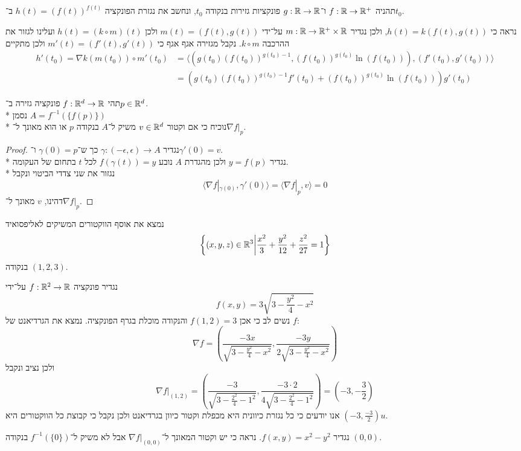 \Subquestion{}
תהניה $f : \mathbb{R} \to \mathbb{R}^+$ ו־$g : \mathbb{R} \to \mathbb{R}$ פונקציות גזירות בנקודה $t_0$, ונחשב את נגזרת הפונקציה $h(t) = {(f(t))}^{f(t)}$ ב־$t_0$.

נראה כי $h(t) = k(f(t), g(t))$, ולכן נגדיר $m : \mathbb{R} \to \mathbb{R}^+ \times \mathbb{R}$ על־ידי $m(t) = (f(t), g(t))$ ולכן $h(t) = (k \circ m)(t)$ ועלינו לגזור את ההרכבה $k \circ m$.
נקבל מגזירה אגף אגף כי $m'(t) = (f'(t), g'(t))$ ולכן מתקיים
\begin{align*}
	h'(t_0) = \nabla k(m(t_0)) \circ m'(t_0)
	& = \langle (g(t_0) {(f(t_0))}^{g(t_0) - 1}, {(f(t_0))}^{g(t_0)} \ln(f(t_0))), (f'(t_0), g'(t_0)) \rangle \\
	& =  (g(t_0) {(f(t_0))}^{g(t_0) - 1} f'(t_0) + {(f(t_0))}^{g(t_0)} \ln(f(t_0))) g'(t_0)
\end{align*}

\Question{}
\Subquestion{}
תהי $f : \mathbb{R}^d \to \mathbb{R}$ פונקציה גזירה ב־$p \in \mathbb{R}^d$. \\*
נסמן $A = f^{-1}(\{f(p)\})$ \\*
נוכיח כי אם וקטור $v \in \mathbb{R}^d$ משיק ל־$A$ בנקודה $p$ או הוא מאונך ל־$\nabla f |_p$.
\begin{proof}
	נגדיר $\gamma : (-\epsilon, \epsilon) \to A$ כך ש־$\gamma(0) = p$ ו־$\gamma'(0) = v$. \\*
	נגדיר $y = f(p)$ ולכן מהגדרת $A$ נובע $f(\gamma(t)) = y$ לכל $t$ בתחום של העקומה. \\*
	נגזור את שני צדדי הביטוי ונקבל
	\[
		\langle \nabla f |_{\gamma(0)}, \gamma'(0) \rangle = \langle \nabla f |_p, v \rangle = 0
	\]
	דהינו, $v$ מאונך ל־$\nabla f |_p$.
\end{proof}

\Subquestion{}
נמצא את אוסף הווקטורים המשיקים לאליפסואיד
\[
	\left\{ (x, y, z) \in \mathbb{R}^3 \middle| \frac{x^2}{3} + \frac{y^2}{12} + \frac{z^2}{27} = 1 \right\}
\]
בנקודה $(1, 2, 3)$.

נגדיר פונקציה $f : \mathbb{R}^2 \to \mathbb{R}$ על־ידי
\[
	f(x, y) = 3 \sqrt{3 - \frac{y^2}{4} - x^2}
\]
נשים לב כי אכן $f(1, 2) = 3$ והנקודה מוכלת בגרף הפונקציה.
נמצא את הגרדיאנט של $f$:
\[
	\nabla f = \left( \frac{-3x}{\sqrt{3 - \frac{y^2}{4} - x^2}}, \frac{-3y}{2\sqrt{3 - \frac{y^2}{4} - x^2}} \right)
\]
ולכן נציב ונקבל
\[
	\nabla f |_{(1, 2)}
	= \left( \frac{-3}{\sqrt{3 - \frac{2^2}{4} - 1^2}}, \frac{-3 \cdot 2}{4\sqrt{3 - \frac{2^2}{4} - 1^2}} \right)
	= (-3, -\frac{3}{2})
\]
אנו יודעים כי כל נגזרת כיוונית היא מכפלת וקטור כיוון בגרדיאנט ולכן נקבל כי קבוצת כל הווקטורים היא $(-3, \frac{-3}{2}) u$.

\Subquestion{}
נגדיר $f(x, y) = x^2 - y^2$. נראה כי יש וקטור המאונך ל־$\nabla f|_{(0, 0)}$ אבל לא משיק ל־$f^{-1}(\{0\})$ בנקודה $(0, 0)$.


